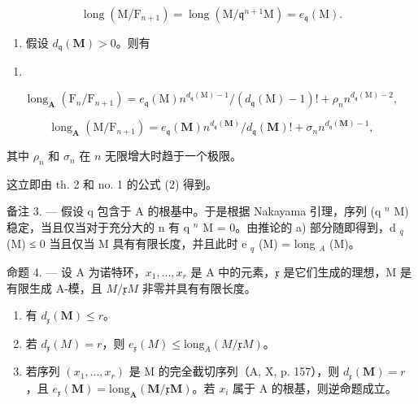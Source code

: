 \[
\operatorname{long} \left(\mathrm{M} / \mathrm{F} _ {n + 1}\right) = \operatorname{long} \left(\mathrm{M} / \mathfrak {q} ^ {n + 1} \mathrm{M}\right) = e _ {\mathfrak {q}} (\mathrm{M}).
\]

\begin{enumerate}
\def\labelenumi{\alph{enumi})}
\setcounter{enumi}{1}
\tightlist
\item
  假设 \(d_{\mathfrak{q}}(\mathbf{M}) > 0\)。则有
\end{enumerate}

\begin{enumerate}
\def\labelenumi{(\arabic{enumi})}
\setcounter{enumi}{12}
\tightlist
\item
\end{enumerate}

\[
\operatorname{long} _ {\mathbf {A}} \left(\mathrm{F} _ {n} / \mathrm{F} _ {n + 1}\right) = e _ {\mathfrak {q}} (\mathrm{M}) n ^ {d _ {\mathfrak {q}} (\mathrm{M}) - 1} / \left(d _ {\mathfrak {q}} (\mathrm{M}) - 1\right)! + \rho_ {n} n ^ {d _ {\mathfrak {q}} (\mathrm{M}) - 2},\tag{14}
\]

\[
\operatorname{long} _ {\mathbf {A}} (\mathrm{M} / \mathrm{F} _ {n + 1}) = e _ {\mathfrak {q}} (\mathbf {M}) n ^ {d _ {\mathfrak {q}} (\mathbf {M})} / d _ {\mathfrak {q}} (\mathbf {M})! + \sigma_ {n} n ^ {d _ {\mathfrak {q}} (\mathbf {M}) - 1},
\]

其中 \(\rho_{n}\) 和 \(\sigma_{n}\) 在 \(n\) 无限增大时趋于一个极限。

这立即由 th. 2 和 no. 1 的公式 (2) 得到。

备注 3. --- 假设 q 包含于 A 的根基中。于是根据 Nakayama 引理，序列 (q \(^{n}\) M) 稳定，当且仅当对于充分大的 n 有 q \(^{n}\) M = 0。由推论的 a) 部分随即得到，d \(_{q}\) (M) ≤ 0 当且仅当 M 具有有限长度，并且此时 e \(_{q}\) (M) = long \(_{A}\) (M)。

命题 4. — 设 A 为诺特环，\(x_{1},...,x_{r}\) 是 A 中的元素，\(\mathfrak{x}\) 是它们生成的理想，M 是有限生成 A-模，且 \(M/\mathfrak{x}M\) 非零并具有有限长度。

\begin{enumerate}
\def\labelenumi{\alph{enumi})}
\item
  有 \(d_{\mathfrak{x}}(\mathbf{M}) \leqslant r\)。
\item
  若 \(d_{\mathfrak{x}}(M) = r\)，则 \(e_{\mathfrak{x}}(M) \leqslant \text{long}_{A}(M/\mathfrak{x}M)\)。
\item
  若序列 \((x_{1},...,x_{r})\) 是 M 的完全截切序列（A, X, p. 157），则 \(d_{\mathfrak{x}}(\mathbf{M}) = r\)，且 \(e_{\mathfrak{x}}(\mathbf{M}) = \text{long}_{\mathbf{A}}(\mathbf{M}/\mathfrak{x}\mathbf{M})\)。若 \(x_{i}\) 属于 A 的根基，则逆命题成立。
\end{enumerate}


